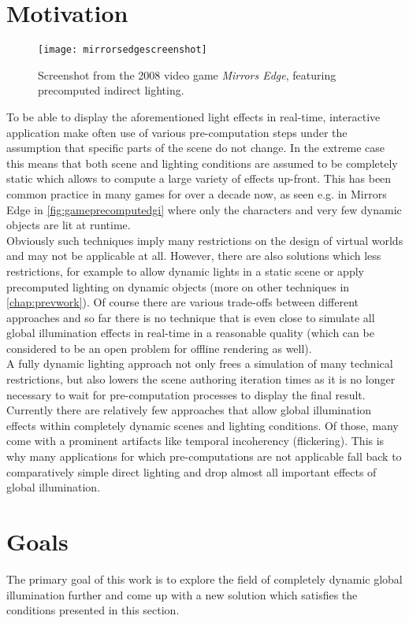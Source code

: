 \documentclass[thesis.tex]{subfiles}
\begin{document}
\section{Motivation}
\begin{figure}[h]
\centering
\texttt{[image: mirrorsedgescreenshot]}
\caption{Screenshot from the 2008 video game \emph{Mirrors Edge}, featuring precomputed indirect lighting.}
\label{fig:gameprecomputedgi}
\end{figure}
To be able to display the aforementioned light effects in real-time, interactive application make often use of various pre-computation steps under the assumption that specific parts of the scene do not change.
In the extreme case this means that both scene and lighting conditions are assumed to be completely static which allows to compute a large variety of effects up-front.
This has been common practice in many games for over a decade now, as seen e.g. in Mirrors Edge in \autoref{fig:gameprecomputedgi} where only the characters and very few dynamic objects are lit at runtime.
\\
Obviously such techniques imply many restrictions on the design of virtual worlds and may not be applicable at all.
However, there are also solutions which less restrictions, for example to allow dynamic lights in a static scene or apply precomputed lighting on dynamic objects (more on other techniques in \autoref{chap:prevwork}).
Of course there are various trade-offs between different approaches and so far there is no technique that is even close to simulate all global illumination effects in real-time in a reasonable quality (which can be considered to be an open problem for offline rendering as well).
\\
A fully dynamic lighting approach not only frees a simulation of many technical restrictions, but also lowers the scene authoring iteration times as it is no longer necessary to wait for pre-computation processes to display the final result.
Currently there are relatively few approaches that allow global illumination effects within completely dynamic scenes and lighting conditions.
Of those, many come with a prominent artifacts like temporal incoherency (flickering).
This is why many applications for which pre-computations are not applicable fall back to comparatively simple direct lighting and drop almost all important effects of global illumination.

\section{Goals} \label{bib:goals}
The primary goal of this work is to explore the field of completely dynamic global illumination further and come up with a new solution which satisfies the conditions presented in this section.
\end{document}
